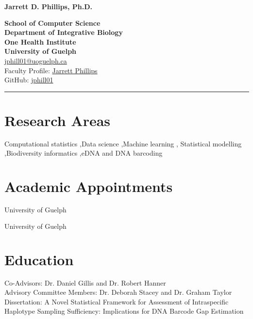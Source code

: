 \begin{center}
  {\fontsize{19}{22.8}\selectfont\bfseries Jarrett D. Phillips, Ph.D.\par}
  \vspace{0.3\baselineskip}
  \textbf{School of Computer Science}\\
  \textbf{Department of Integrative Biology}\\
  \textbf{One Health Institute}\\
  \textbf{University of Guelph}\\
  \href{mailto:jphill01@uoguelph.ca}{jphill01@uoguelph.ca}\\
  Faculty Profile: \href{https://www.uoguelph.ca/profile/jarrett-phillips}{Jarrett Phillips}\\
  GitHub: \href{https://jphill01.github.io/}{jphill01}
\end{center}
\vspace{-0.4\baselineskip}
\noindent\rule{\linewidth}{0.5pt}

\section{Research Areas}
Computational statistics \sep Data science \sep Machine learning \sep
Statistical modelling \sep Biodiversity informatics \sep eDNA and DNA barcoding

\section{Academic Appointments}
University of Guelph

\smallskip
{}
University of Guelph

\section{Education}
Co-Advisors: Dr. Daniel Gillis and Dr. Robert Hanner\\
Advisory Committee Members: Dr. Deborah Stacey and Dr. Graham Taylor\\
Dissertation: A Novel Statistical Framework for Assessment of Intraspecific
Haplotype Sampling Sufficiency: Implications for DNA Barcode Gap
Estimation


